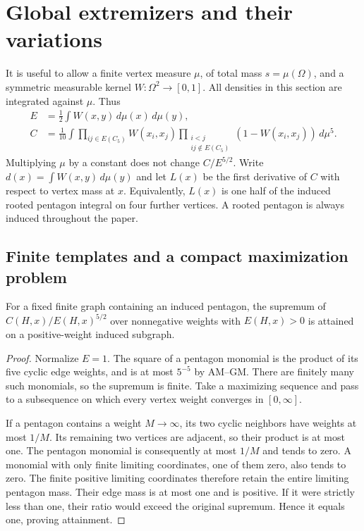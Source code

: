 \section{Global extremizers and their variations}

It is useful to allow a finite vertex measure \(\mu\), of total mass
\(s=\mu(\Omega)\), and a symmetric measurable kernel
\(W:\Omega^2\to[0,1]\). All densities in this section are integrated against
\(\mu\). Thus
\begin{align*}
 E&=\frac12\int W(x,y)\,d\mu(x)\,d\mu(y),\\
 C&=\frac1{10}\int
      \prod_{ij\in E(C_5)}W(x_i,x_j)
      \prod_{\substack{i<j\\ij\notin E(C_5)}}(1-W(x_i,x_j))\,d\mu^5.
\end{align*}
Multiplying \(\mu\) by a constant does not change \(C/E^{5/2}\).
Write \(d(x)=\allowbreak\int W(x,y)\,d\mu(y)\) and let \(L(x)\) be the first
derivative of \(C\) with respect to vertex mass at \(x\). Equivalently,
\(L(x)\) is one half of the induced rooted pentagon integral on four
further vertices. A rooted pentagon is always induced throughout the paper.

\subsection{Finite templates and a compact maximization problem}

\begin{lemma}\label{lem:finite-attainment}
For a fixed finite graph containing an induced pentagon, the supremum of
\(C(H,x)/E(H,x)^{5/2}\) over nonnegative weights with \(E(H,x)>0\) is
attained on a positive-weight induced subgraph.
\end{lemma}
\begin{proof}
Normalize \(E=1\). The square of a pentagon monomial is the product of its
five cyclic edge weights, and is at most \(5^{-5}\) by AM--GM. There are
finitely many such monomials, so the supremum is finite. Take a maximizing
sequence and pass to a subsequence on which every vertex weight converges
in \([0,\infty]\).

If a pentagon contains a weight \(M\to\infty\), its two cyclic neighbors
have weights at most \(1/M\). Its remaining two vertices are adjacent, so
their product is at most one. The pentagon monomial is consequently at
most \(1/M\) and tends to zero. A monomial with only finite limiting
coordinates, one of them zero, also tends to zero. The finite positive
limiting coordinates therefore retain the entire limiting pentagon mass.
Their edge mass is at most one and is positive. If it were strictly less
than one, their ratio would exceed the original supremum. Hence it equals
one, proving attainment.
\end{proof}


